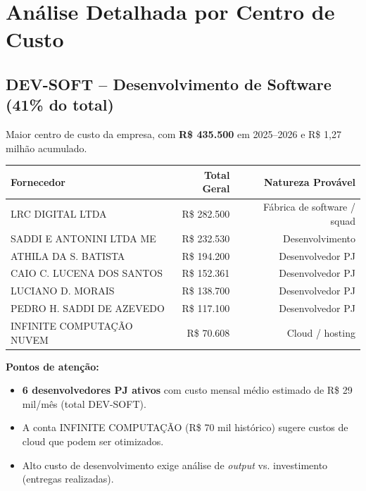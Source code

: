 \documentclass[12pt, a4paper]{article}
\newcommand{\reais}[1]{R\$ #1}
\begin{document}
\newpage
\section{Análise Detalhada por Centro de Custo}

\subsection{DEV-SOFT -- Desenvolvimento de Software (41\% do total)}

Maior centro de custo da empresa, com \textbf{R\$ 435.500} em 2025--2026 e R\$ 1,27 milhão acumulado.

\begin{table}[H]
    \centering
    \small
    \renewcommand{\arraystretch}{1.3}
    \begin{tabularx}{\textwidth}{X r r}
        \toprule
        \rowcolor{tableHeader} \textbf{Fornecedor} & \textbf{Total Geral} & \textbf{Natureza Provável} \\
        \midrule
        LRC DIGITAL LTDA & \reais{282.500} & Fábrica de software / squad \\
        SADDI E ANTONINI LTDA ME & \reais{232.530} & Desenvolvimento \\
        ATHILA DA S. BATISTA & \reais{194.200} & Desenvolvedor PJ \\
        CAIO C. LUCENA DOS SANTOS & \reais{152.361} & Desenvolvedor PJ \\
        LUCIANO D. MORAIS & \reais{138.700} & Desenvolvedor PJ \\
        PEDRO H. SADDI DE AZEVEDO & \reais{117.100} & Desenvolvedor PJ \\
        INFINITE COMPUTAÇÃO NUVEM & \reais{70.608} & Cloud / hosting \\
        \bottomrule
    \end{tabularx}
\end{table}

\textcolor{accentColor}{\textbf{Pontos de atenção:}}
\begin{itemize}[nosep]
    \item \textbf{6 desenvolvedores PJ ativos} com custo mensal médio estimado de R\$ 29 mil/mês (total DEV-SOFT).
    \item A conta INFINITE COMPUTAÇÃO (R\$ 70 mil histórico) sugere custos de cloud que podem ser otimizados.
    \item Alto custo de desenvolvimento exige análise de \textit{output} vs. investimento (entregas realizadas).
\end{itemize}
\end{document}

